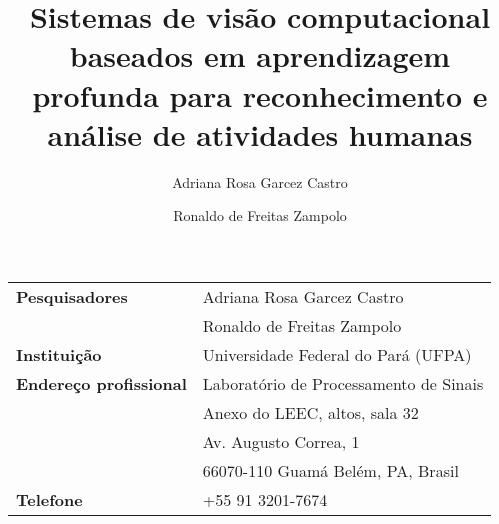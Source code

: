 

\title{Sistemas de visão computacional baseados em aprendizagem profunda para reconhecimento e análise de atividades humanas}

\author[1]{Adriana Rosa Garcez Castro}
\author[2]{Ronaldo de Freitas Zampolo}



\maketitle

\begin{table}[!th]
\begin{tabular}{|l p{}|}
\hline
\textbf{Pesquisadores}        & Adriana Rosa Garcez Castro\\
	                      & Ronaldo de Freitas Zampolo \\
\textbf{Instituição}          & Universidade Federal do Pará (UFPA)\\
\textbf{Endereço profissional}& Laboratório de Processamento de Sinais\\
                              & Anexo do LEEC, altos, sala 32\\
                              & Av. Augusto Correa, 1\\
                              & 66070-110 Guamá Belém, PA, Brasil\\
\textbf{Telefone}             & +55 91 3201-7674 \\

\end{tabular}
\end{table}

